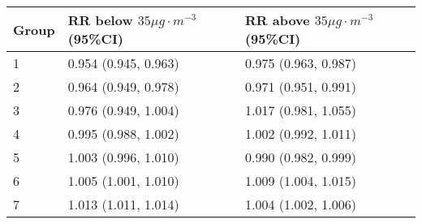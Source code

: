\begin{tabular}{lll}
  \hline
Group & RR below $35 \mu g \cdot m^{-3}$ (95\%CI) & RR above $35 \mu g \cdot m^{-3}$ (95\%CI) \\ 
  \hline
   1 & 0.954 (0.945, 0.963) & 0.975 (0.963, 0.987) \\ 
     2 & 0.964 (0.949, 0.978) & 0.971 (0.951, 0.991) \\ 
     3 & 0.976 (0.949, 1.004) & 1.017 (0.981, 1.055) \\ 
     4 & 0.995 (0.988, 1.002) & 1.002 (0.992, 1.011) \\ 
     5 & 1.003 (0.996, 1.010) & 0.990 (0.982, 0.999) \\ 
     6 & 1.005 (1.001, 1.010) & 1.009 (1.004, 1.015) \\ 
     7 & 1.013 (1.011, 1.014) & 1.004 (1.002, 1.006) \\ 
   \hline
\end{tabular}

